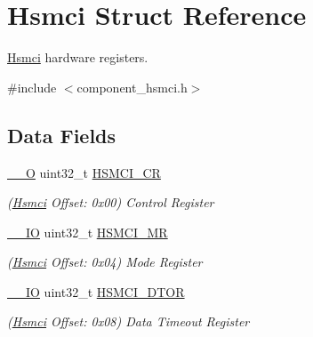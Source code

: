 \hypertarget{structHsmci}{}\section{Hsmci Struct Reference}
\label{structHsmci}


\mbox{\hyperlink{structHsmci}{Hsmci}} hardware registers.  




{\ttfamily \#include $<$component\+\_\+hsmci.\+h$>$}

\subsection*{Data Fields}
\begin{DoxyCompactItemize}
\item 
\mbox{\label{structHsmci_af7040630930551fe473e0f253ca567b4}} 
\mbox{\hyperlink{core__cm7_8h_a7e25d9380f9ef903923964322e71f2f6}{\+\_\+\+\_\+O}} uint32\+\_\+t \mbox{\hyperlink{structHsmci_af7040630930551fe473e0f253ca567b4}{H\+S\+M\+C\+I\+\_\+\+CR}}
\begin{DoxyCompactList}\small\item\em (\mbox{\hyperlink{structHsmci}{Hsmci}} Offset\+: 0x00) Control Register \end{DoxyCompactList}\item 
\mbox{\label{structHsmci_a49c5d303e47fb69469a4a75b1da89b8a}} 
\mbox{\hyperlink{core__cm7_8h_aec43007d9998a0a0e01faede4133d6be}{\+\_\+\+\_\+\+IO}} uint32\+\_\+t \mbox{\hyperlink{structHsmci_a49c5d303e47fb69469a4a75b1da89b8a}{H\+S\+M\+C\+I\+\_\+\+MR}}
\begin{DoxyCompactList}\small\item\em (\mbox{\hyperlink{structHsmci}{Hsmci}} Offset\+: 0x04) Mode Register \end{DoxyCompactList}\item 
\mbox{\label{structHsmci_a76e0ff005b2594d36e332a7c2dd8f5c9}} 
\mbox{\hyperlink{core__cm7_8h_aec43007d9998a0a0e01faede4133d6be}{\+\_\+\+\_\+\+IO}} uint32\+\_\+t \mbox{\hyperlink{structHsmci_a76e0ff005b2594d36e332a7c2dd8f5c9}{H\+S\+M\+C\+I\+\_\+\+D\+T\+OR}}
\begin{DoxyCompactList}\small\item\em (\mbox{\hyperlink{structHsmci}{Hsmci}} Offset\+: 0x08) Data Timeout Register \end{DoxyCompactList}\item 

\end{DoxyCompactItemize}

